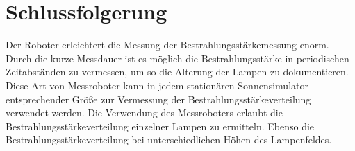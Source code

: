 \documentclass[a4paper,bibtotoc,oneside]{scrbook}
\begin{document}
 





\section{Schlussfolgerung}\thispagestyle{empty}

Der Roboter erleichtert die Messung der Bestrahlungsstärkemessung enorm. Durch die kurze Messdauer ist es möglich die Bestrahlungsstärke in periodischen Zeitabständen zu vermessen, um so die Alterung der Lampen zu dokumentieren. 
Diese Art von Messroboter kann in jedem stationären Sonnensimulator entsprechender Größe zur Vermessung der Bestrahlungsstärkeverteilung verwendet werden. 
Die Verwendung des Messroboters erlaubt die Bestrahlungsstärkeverteilung einzelner Lampen zu ermitteln.
Ebenso die Bestrahlungsstärkeverteilung bei unterschiedlichen Höhen des Lampenfeldes.







\listoffigures
{} %
\newpage

\listoftables 
{} %
\newpage
\end{document}
